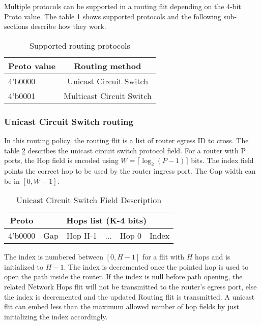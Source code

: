 Multiple protocols can be supported in a routing flit depending on the 4-bit Proto value. The table
\ref{supported_protocol} shows supported protocols and the following sub-sections describe how they work.


\begin{table}[h]
  \centering
  \begin{tabular}{l | c}
    \toprule\hline
    \textbf{Proto value} & \textbf{Routing method} \\
    \hline\hline
    4'b0000 & Unicast Circuit Switch \\
    \hline
    4'b0001 & Multicast Circuit Switch \\
    \hline\bottomrule
  \end{tabular}
  \caption{\label{supported_protocol} Supported routing protocols}
\end{table}


\subsubsection{Unicast Circuit Switch routing}

In this routing policy, the routing flit is a list of router egress ID to cross. The table
\ref{unicast_circuit_switch_field} describes the unicast circuit switch protocol field. For a router with P ports, the
Hop field is encoded using $W=\lceil \log_2(P-1)\rceil$ bits. The index field points the correct hop to be used by the
router ingress port. The Gap width can be in $[0, W-1]$.

\begin{table}[h]
  \centering
  \begin{tabular}{c | c | c | c | c | c}
    \toprule
    \hline
    \textbf{Proto} & \multicolumn{5}{c}{\textbf{Hops list (K-4 bits)}} \\
    \hline\hline
    4'b0000 & Gap & Hop H-1 & ... & Hop 0 & Index \\
    \hline
    \bottomrule
  \end{tabular}
  \caption{\label{unicast_circuit_switch_field} Unicast Circuit Switch Field Description}
\end{table}

The index is numbered between $[0, H-1]$ for a flit with $H$ hops and is initialized to $H-1$. The index is decremented
once the pointed hop is used to open the path inside the router. If the index is null before path opening, the related
Network Hops flit will not be transmitted to the router's egress port, else the index is decremented and the updated
Routing flit is transmitted. A unicast flit can embed less than the maximum allowed number of hop fields by just
initializing the index accordingly.

